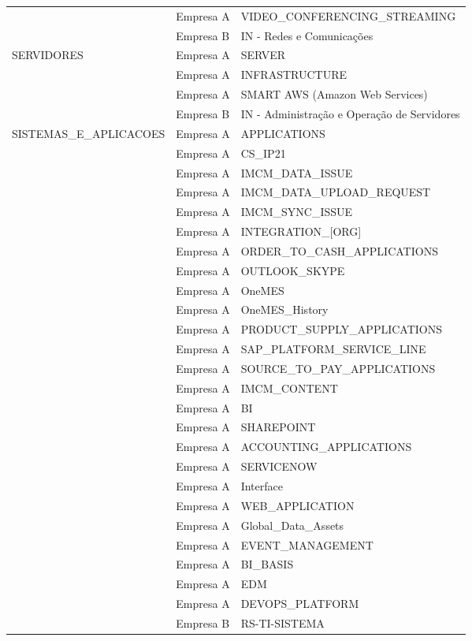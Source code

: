 \documentclass[
    12pt,                %
    openright,           %
    oneside,             %
    a4paper,             %
    english,             %
    brazil               %
]{abntex2}
\begin{document}
\begin{apendicesenv}
{\begin{longtable}{p{5.5cm}p{1.7cm}p{7.5cm}}
     & Empresa A & VIDEO\_CONFERENCING\_STREAMING \\
     & Empresa B & IN - Redes e Comunicações \\
    \midrule
    SERVIDORES & Empresa A & SERVER \\
     & Empresa A & INFRASTRUCTURE \\
     & Empresa A & SMART AWS (Amazon Web Services) \\
     & Empresa B & IN - Administração e Operação de Servidores \\
    \midrule
    SISTEMAS\_E\_APLICACOES & Empresa A & APPLICATIONS \\
     & Empresa A & CS\_IP21 \\
     & Empresa A & IMCM\_DATA\_ISSUE \\
     & Empresa A & IMCM\_DATA\_UPLOAD\_REQUEST \\
     & Empresa A & IMCM\_SYNC\_ISSUE \\
     & Empresa A & INTEGRATION\_[ORG] \\
     & Empresa A & ORDER\_TO\_CASH\_APPLICATIONS \\
     & Empresa A & OUTLOOK\_SKYPE \\
     & Empresa A & OneMES \\
     & Empresa A & OneMES\_History \\
     & Empresa A & PRODUCT\_SUPPLY\_APPLICATIONS \\
     & Empresa A & SAP\_PLATFORM\_SERVICE\_LINE \\
     & Empresa A & SOURCE\_TO\_PAY\_APPLICATIONS \\
     & Empresa A & IMCM\_CONTENT \\
     & Empresa A & BI \\
     & Empresa A & SHAREPOINT \\
     & Empresa A & ACCOUNTING\_APPLICATIONS \\
     & Empresa A & SERVICENOW \\
     & Empresa A & Interface \\
     & Empresa A & WEB\_APPLICATION \\
     & Empresa A & Global\_Data\_Assets \\
     & Empresa A & EVENT\_MANAGEMENT \\
     & Empresa A & BI\_BASIS \\
     & Empresa A & EDM \\
     & Empresa A & DEVOPS\_PLATFORM \\
     & Empresa B & RS-TI-SISTEMA \\

\end{longtable}}
\end{apendicesenv}
\end{document}
